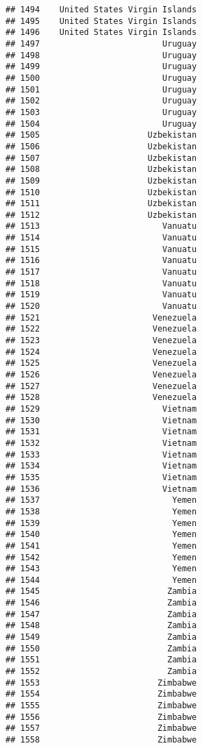 \documentclass[]{article}
\begin{document}
\begin{verbatim}
## 1494    United States Virgin Islands
## 1495    United States Virgin Islands
## 1496    United States Virgin Islands
## 1497                         Uruguay
## 1498                         Uruguay
## 1499                         Uruguay
## 1500                         Uruguay
## 1501                         Uruguay
## 1502                         Uruguay
## 1503                         Uruguay
## 1504                         Uruguay
## 1505                      Uzbekistan
## 1506                      Uzbekistan
## 1507                      Uzbekistan
## 1508                      Uzbekistan
## 1509                      Uzbekistan
## 1510                      Uzbekistan
## 1511                      Uzbekistan
## 1512                      Uzbekistan
## 1513                         Vanuatu
## 1514                         Vanuatu
## 1515                         Vanuatu
## 1516                         Vanuatu
## 1517                         Vanuatu
## 1518                         Vanuatu
## 1519                         Vanuatu
## 1520                         Vanuatu
## 1521                       Venezuela
## 1522                       Venezuela
## 1523                       Venezuela
## 1524                       Venezuela
## 1525                       Venezuela
## 1526                       Venezuela
## 1527                       Venezuela
## 1528                       Venezuela
## 1529                         Vietnam
## 1530                         Vietnam
## 1531                         Vietnam
## 1532                         Vietnam
## 1533                         Vietnam
## 1534                         Vietnam
## 1535                         Vietnam
## 1536                         Vietnam
## 1537                           Yemen
## 1538                           Yemen
## 1539                           Yemen
## 1540                           Yemen
## 1541                           Yemen
## 1542                           Yemen
## 1543                           Yemen
## 1544                           Yemen
## 1545                          Zambia
## 1546                          Zambia
## 1547                          Zambia
## 1548                          Zambia
## 1549                          Zambia
## 1550                          Zambia
## 1551                          Zambia
## 1552                          Zambia
## 1553                        Zimbabwe
## 1554                        Zimbabwe
## 1555                        Zimbabwe
## 1556                        Zimbabwe
## 1557                        Zimbabwe
## 1558                        Zimbabwe

\end{verbatim}
\end{document}
